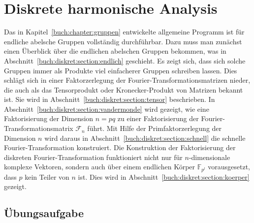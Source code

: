 %
%
%
\chapter{Diskrete harmonische Analysis
\label{buch:chapter:diskret}}
Das in Kapitel~\ref{buch:chapter:gruppen} entwickelte allgemeine
Programm ist für endliche abelsche Gruppen vollständig durchführbar.
Dazu muss man zunächst einen Überblick über die endlichen abelschen
Gruppen bekommen, was in Abschnitt~\ref{buch:diskret:section:endlich}
geschieht.
Es zeigt sich, dass sich solche Gruppen immer als Produkte viel
einfacherer Gruppen schreiben lassen.
Dies schlägt sich in einer Faktorzerlegung der
Fourier-Transformationsmatrizen nieder, die auch als das
Tensorprodukt oder Kronecker-Produkt von Matrizen bekannt ist.
Sie wird in Abschnitt~\ref{buch:diskret:section:tensor}
beschrieben.
In Abschnitt~\ref{buch:diskret:section:vandermonde} wird
gezeigt, wie eine Faktorisierung der Dimension $n=pq$ zu einer
Faktorisierung der Fourier-Transformationsmatrix $\mathscr{F}_n$
führt.
Mit Hilfe der Primfaktorzerlegung der Dimension $n$ wird daraus
in Abschnitt~\ref{buch:diskret:section:schnell} die schnelle
Fourier-Transformation konstruiert.
Die Konstruktion der Faktorisierung der diskreten Fourier-Transformation
funktioniert nicht nur für $n$-dimensionale komplexe Vektoren, sondern
auch über einem endlichen Körper $\mathbb{F}_{p^l}$ vorausgesetzt, dass
$p$ kein Teiler von $n$ ist.
Dies wird in Abschnitt~\ref{buch:diskret:section:koerper} gezeigt.









\section*{Übungsaufgabe}
\begin{uebungsaufgaben}
\end{uebungsaufgaben}

